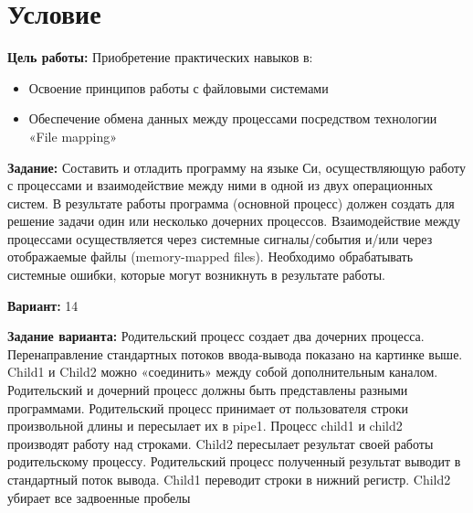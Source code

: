 \section{Условие}
{\bfseries Цель работы:} 
Приобретение практических навыков в:
\begin{itemize}
  \item Освоение принципов работы с файловыми системами
  \item Обеспечение обмена данных между процессами посредством технологии «File mapping»
\end{itemize}

{\bfseries Задание:} Составить и отладить программу на языке Си, осуществляющую работу с
 процессами и взаимодействие между ними в одной из двух операционных систем. В результате
работы программа (основной процесс) должен создать для решение задачи один или несколько
дочерних процессов. Взаимодействие между процессами осуществляется через системные
сигналы/события и/или через отображаемые файлы (memory-mapped files).
Необходимо обрабатывать системные ошибки, которые могут возникнуть в результате работы.

{\bfseries Вариант:} 14

{\bfseries Задание варианта:}
Родительский процесс создает два дочерних процесса. Перенаправление стандартных потоков
ввода-вывода показано на картинке выше. Child1 и Child2 можно «соединить» между собой
дополнительным каналом. Родительский и дочерний процесс должны быть представлены
разными программами.
Родительский процесс принимает от пользователя строки произвольной длины и пересылает их в
pipe1. Процесс child1 и child2 производят работу над строками. Child2 пересылает результат своей
работы родительскому процессу. Родительский процесс полученный результат выводит в
стандартный поток вывода.
Child1 переводит строки в нижний регистр. Child2 убирает все задвоенные пробелы

